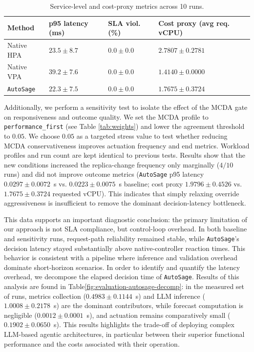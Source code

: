 \documentclass[sigconf]{acmart}
\newcommand{\Solution}{\texttt{AutoSage}}
\begin{document}
\begin{table}[t]
  \centering
  \caption{Service-level and cost-proxy metrics across 10 runs.}
  \label{tab:service-cost}
  \footnotesize
  \setlength{\tabcolsep}{3pt}
  \renewcommand{\arraystretch}{1.1}
  \begin{tabular}{>{\raggedright\arraybackslash}p{1.65cm}
                  >{\raggedleft\arraybackslash}p{1.15cm}
                  >{\raggedleft\arraybackslash}p{1.15cm}
                  >{\raggedleft\arraybackslash}p{1.55cm}}
    \toprule
    Method & p95 latency (ms) & SLA viol. (\%) & Cost proxy (avg req. vCPU) \\
    \midrule
    Native HPA & \(23.5 \pm 8.7\) & \(0.0 \pm 0.0\) & \(2.7807 \pm 0.2781\) \\
    Native VPA & \(39.2 \pm 7.6\) & \(0.0 \pm 0.0\) & \(1.4140 \pm 0.0000\) \\
    \Solution{} & \(22.3 \pm 7.5\) & \(0.0 \pm 0.0\) & \(1.7675 \pm 0.3724\) \\
    \bottomrule
  \end{tabular}
\end{table}

Additionally, we perform a sensitivity test to isolate the effect of the MCDA gate on responsiveness and outcome quality. We set the MCDA profile to \texttt{performance\_first} (see Table \ref{tab:weights}) and lower the agreement threshold to \(0.05\). We choose \(0.05\) as a targeted stress value to test whether reducing MCDA conservativeness improves actuation frequency and end metrics. Workload profiles and run count are kept identical to previous tests.
Results show that the new conditions increased the replica-change frequency only marginally (\(4/10\) runs) and did not
improve outcome metrics (\Solution{} p95 latency \(0.0297 \pm 0.0072\)~s vs.
\(0.0223 \pm 0.0075\)~s baseline; cost proxy \(1.9796 \pm 0.4526\) vs.
\(1.7675 \pm 0.3724\) requested vCPU). This indicates that simply relaxing override aggressiveness is insufficient to remove the dominant decision-latency bottleneck.

This data supports an important diagnostic conclusion: the primary limitation of our approach is not SLA compliance, but control-loop overhead. In both baseline and
sensitivity runs, request-path reliability remained stable,
while \Solution{}'s decision latency stayed substantially above native-controller
reaction times. This behavior is consistent with a pipeline where inference and
validation overhead dominate short-horizon scenarios.
In order to identify and quantify the latency overhead, we decompose the elapsed decision time of \Solution{}.
Results of this analysis are found in Table\ref{fig:evaluation-autosage-decomp}: in the measured set of runs, metrics collection (\(0.4983 \pm 0.1144\)~s) and LLM
inference (\(1.0008 \pm 0.2178\)~s) are the dominant contributors, while
forecast computation is negligible (\(0.0012 \pm 0.0001\)~s), and actuation
remains comparatively small (\(0.1902 \pm 0.0650\)~s). This results highlights the trade-off of deploying complex LLM-based agentic architectures, in particular between their superior functional performance and the costs associated with their operation.
\end{document}
